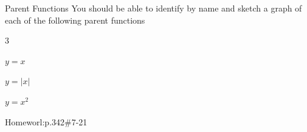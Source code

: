 \documentclass{beamer}
\begin{document}
\begin{frame}[t]{Parent Functions}\vspace{4pt}
You should be able to identify by name and sketch a graph of each of the following parent functions
\begin{enumerate}
\begin{multicols}{3}
\item $y=x$
\item $y=|x|$
{\item $y=x^2$}
\end{multicols}
\end{enumerate}
\end{frame}

\begin{frame}[standout]
\flushleft
Homeworl:p.342\#7-21
\end{frame}
\end{document}
